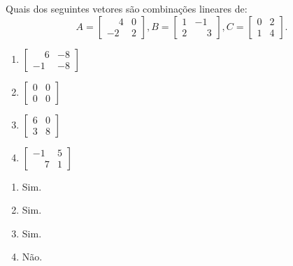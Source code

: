 \documentclass[12pt]{exam}
\begin{document}
\begin{exercicio}
    Quais dos seguintes vetores são combinações lineares de:
    \[
        A = \begin{bmatrix}
            \phantom{-} 4 & 0\\-2 & 2
        \end{bmatrix},
        B = \begin{bmatrix}
            1 & -1\\2 & \phantom{-} 3
        \end{bmatrix},
        C = \begin{bmatrix}
            0 & 2\\1 & 4
        \end{bmatrix}.
    \]
    \begin{multicols}{2}
        \begin{enumerate}[label={\alph*})]
            \item $\begin{bmatrix}
                \phantom{-} 6 & -8\\-1 & -8
            \end{bmatrix}$

            \item $\begin{bmatrix}
                0 & 0\\0 & 0
            \end{bmatrix}$

            \item $\begin{bmatrix}
                6 & 0\\3 & 8
            \end{bmatrix}$

            \item $\begin{bmatrix}
                -1 & 5\\\phantom{-} 7 & 1
            \end{bmatrix}$
        \end{enumerate}
    \end{multicols}
    \begin{solucao}
    	\begin{enumerate}[label={\alph*})]
    		\item Sim.

    		\item Sim.

    		\item Sim.

    		\item Não.
    	\end{enumerate}
    \end{solucao}
\end{exercicio}
\end{document}
